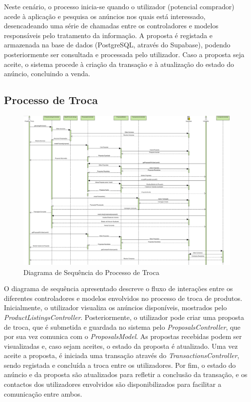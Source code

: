\documentclass[a4paper, 12pt]{article} %
\begin{document}
Neste cenário, o processo inicia-se quando o utilizador (potencial comprador) acede à aplicação e pesquisa os anúncios nos quais está interessado, desencadeando uma série de chamadas entre os controladores e modelos responsáveis pelo tratamento da informação. A proposta é registada e armazenada na base de dados (PostgreSQL, através do Supabase), podendo posteriormente ser consultada e processada pelo utilizador. Caso a proposta seja aceite, o sistema procede à criação da transação e à atualização do estado do anúncio, concluindo a venda.


\subsection{Processo de Troca}
\begin{figure}[ht]
	\centering
	\includegraphics[width=\textwidth]{../images/sequence-diagram-swap.png}
	\caption{Diagrama de Sequência do Processo de Troca}
	\label{fig:diagrama_sequencia_troca}
\end{figure}

O diagrama de sequência apresentado descreve o fluxo de interações entre os diferentes controladores e modelos envolvidos no processo de troca de produtos. Inicialmente, o utilizador visualiza os anúncios disponíveis, mostrados pelo \textit{ProductListingsController}. Posteriormente, o utilizador pode criar uma proposta de troca, que é submetida e guardada no sistema pelo \textit{ProposalsController}, que por sua vez comunica com o \textit{ProposalsModel}. As propostas recebidas podem ser visualizadas e, caso sejam aceites, o estado da proposta é atualizado. Uma vez aceite a proposta, é iniciada uma transação através do \textit{TransactionsController}, sendo registada e concluída a troca entre os utilizadores. Por fim, o estado do anúncio e da proposta são atualizados para refletir a conclusão da transação, e os contactos dos utilizadores envolvidos são disponibilizados para facilitar a comunicação entre ambos.
\end{document}
